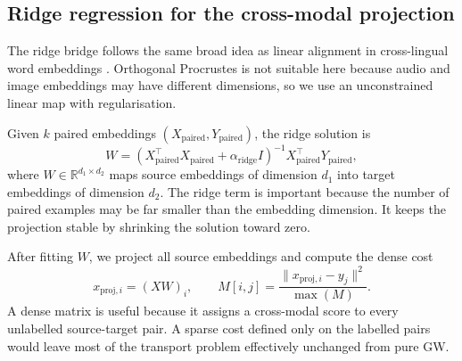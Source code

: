 \subsection{Ridge regression for the cross-modal projection}
\label{subsec:ridge}

The ridge bridge follows the same broad idea as linear alignment in cross-lingual word embeddings \cite{mikolov2013exploiting}. Orthogonal Procrustes is not suitable here because audio and image embeddings may have different dimensions, so we use an unconstrained linear map with regularisation.

Given $k$ paired embeddings $(X_{\mathrm{paired}},Y_{\mathrm{paired}})$, the ridge solution is
\[
W =
\left(
X_{\mathrm{paired}}^\top X_{\mathrm{paired}}
+
\alpha_{\mathrm{ridge}} I
\right)^{-1}
X_{\mathrm{paired}}^\top Y_{\mathrm{paired}},
\]
where $W \in \mathbb{R}^{d_1 \times d_2}$ maps source embeddings of dimension $d_1$ into target embeddings of dimension $d_2$. The ridge term is important because the number of paired examples may be far smaller than the embedding dimension. It keeps the projection stable by shrinking the solution toward zero.

After fitting $W$, we project all source embeddings and compute the dense cost
\[
x_{\mathrm{proj},i} = (XW)_i,
\qquad
M[i,j] =
\frac{\|x_{\mathrm{proj},i}-y_j\|^2}{\max(M)}.
\]
A dense matrix is useful because it assigns a cross-modal score to every unlabelled source-target pair. A sparse cost defined only on the labelled pairs would leave most of the transport problem effectively unchanged from pure GW.

